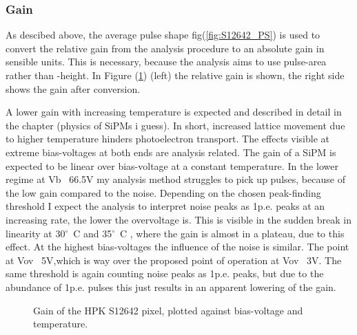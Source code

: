 \documentclass[article,type=msc,colorback,accentcolor=tud9c]{tudthesis}
\begin{document}
    \newpage
     \subsubsection{Gain}
     As descibed above, the average pulse shape fig(\ref{fig:S12642_PS}) is used to convert the relative gain from the analysis procedure to an absolute gain in sensible units. This is necessary, because the analysis aims to use pulse-area rather than -height. In Figure (\ref{fig:S12642_Gain}) (left) the relative gain is shown, the right side shows the gain after conversion.
     
     A lower gain with increasing temperature is expected and described in detail in the chapter (physics of SiPMs i guess). In short, increased lattice movement due to higher temperature hinders photoelectron transport. The effects visible at extreme bias-voltages at both ends are analysis related. The gain of a SiPM is expected to be linear over bias-voltage at a constant temperature. In the lower regime at Vb ~66.5V my analysis method struggles to pick up pulses, because of the low gain compared to the noise. Depending on the chosen peak-finding threshold I expect the analysis to interpret noise peaks as 1p.e. peaks at an increasing rate, the lower the overvoltage is. This is visible in the sudden break in linearity at 30$^{\circ}$~C and 35$^{\circ}$~C , where the gain is almost in a plateau, due to this effect. At the highest bias-voltages the influence of the noise is similar. The point at Vov ~5V,which is way over the proposed point of operation at Vov ~3V. The same threshold is again counting noise peaks as 1p.e. peaks, but due to the abundance of 1p.e. pulses this just results in an apparent lowering of the gain. 
         
     
     
    \begin{figure}[h]
    \begin{centering}
    
    \caption{Gain of the HPK S12642 pixel, plotted against bias-voltage and temperature. }
    \label{fig:S12642_Gain}
    \end{centering}
    \end{figure}
\end{document}
